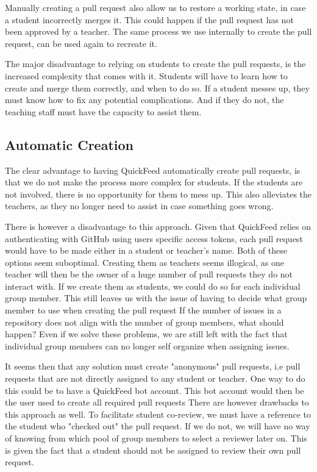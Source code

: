 Manually creating a pull request also allow us to restore a working state, in case a student incorrectly merges it.
This could happen if the pull request has not been approved by a teacher.
The same process we use internally to create the pull request, can be used again to recreate it.

The major disadvantage to relying on students to create the pull requests, is the increased complexity that comes with it.
Students will have to learn how to create and merge them correctly, and when to do so.
If a student messes up, they must know how to fix any potential complications.
And if they do not, the teaching staff must have the capacity to assist them.

\subsection{Automatic Creation}

The clear advantage to having QuickFeed automatically create pull requests, is that we do not make the process more complex for students.
If the students are not involved, there is no opportunity for them to mess up.
This also alleviates the teachers, as they no longer need to assist in case something goes wrong.

There is however a disadvantage to this approach.
Given that QuickFeed relies on authenticating with GitHub using users specific access tokens, each pull request would have to be made either in a student or teacher's name.
Both of these options seem suboptimal.
Creating them as teachers seems illogical, as one teacher will then be the owner of a huge number of pull requests they do not interact with.
If we create them as students, we could do so for each individual group member.
This still leaves us with the issue of having to decide what group member to use when creating the pull request
If the number of issues in a repository does not align with the number of group members, what should happen?
Even if we solve these problems, we are still left with the fact that individual group members can no longer self organize when assigning issues.

It seems then that any solution must create "anonymous" pull requests, i.e pull requests that are not directly assigned to any student or teacher.
One way to do this could be to have a QuickFeed bot account.
This bot account would then be the user used to create all required pull requests 
There are however drawbacks to this approach as well.
To facilitate student co-review, we must have a reference to the student who "checked out" the pull request.
If we do not, we will have no way of knowing from which pool of group members to select a reviewer later on.
This is given the fact that a student should not be assigned to review their own pull request.

